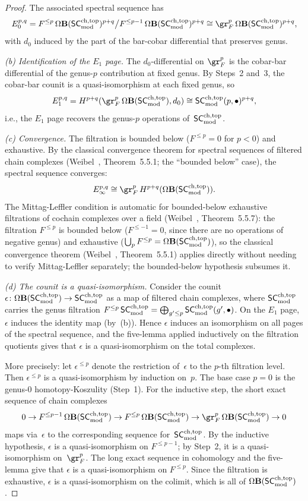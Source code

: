 \begin{proof}
The associated spectral sequence has
\[
 E_0^{p,q}
 = F^{\le p}\, \Omega\mathbf{B}(\SCmod)^{p+q} \big/
 F^{\le p-1}\, \Omega\mathbf{B}(\SCmod)^{p+q}
 \cong
 \gr_F^p\, \Omega\mathbf{B}(\SCmod)^{p+q},
\]
with $d_0$ induced by the part of the bar-cobar differential
that preserves genus.

\medskip
\emph{(b) Identification of the $E_1$ page.}
The $d_0$-differential on $\gr_F^p$ is the cobar-bar differential
of the genus-$p$ contribution at fixed genus. By Steps~2 and~3,
the cobar-bar counit is a quasi-isomorphism at each fixed genus,
so
\[
 E_1^{p,q}
 = H^{p+q}(\gr_F^p\, \Omega\mathbf{B}(\SCmod), d_0)
 \cong \SCmod(p, \bullet)^{p+q},
\]
i.e., the $E_1$ page recovers the genus-$p$ operations of~$\mathsf{SC}^{\mathrm{ch,top}}_{\mathrm{mod}}$.

\medskip
\emph{(c) Convergence.}
The filtration is bounded below ($F^{\le p} = 0$ for $p < 0$)
and exhaustive. By the classical convergence theorem for
spectral sequences of filtered chain complexes
(Weibel~\cite{Wei94}, Theorem~5.5.1; the ``bounded below''
case), the spectral sequence converges:
\[
 E_\infty^{p,q} \cong \gr_F^p\, H^{p+q}(\Omega\mathbf{B}(\SCmod)).
\]
The Mittag-Leffler condition is automatic for bounded-below
exhaustive filtrations of cochain complexes over a field
(Weibel~\cite{Wei94}, Theorem~5.5.7): the filtration
$F^{\le p}$ is bounded below ($F^{\le -1} = 0$, since there
are no operations of negative genus) and exhaustive
($\bigcup_p F^{\le p} = \Omega\mathbf{B}(\mathsf{SC}^{\mathrm{ch,top}}_{\mathrm{mod}})$), so the
classical convergence theorem (Weibel~\cite{Wei94},
Theorem~5.5.1) applies directly without needing to verify
Mittag-Leffler separately; the bounded-below hypothesis
subsumes it.

\medskip
\emph{(d) The counit is a quasi-isomorphism.}
Consider the counit $\epsilon \colon \Omega\mathbf{B}(\mathsf{SC}^{\mathrm{ch,top}}_{\mathrm{mod}})
\to \mathsf{SC}^{\mathrm{ch,top}}_{\mathrm{mod}}$ as a map of filtered chain complexes, where $\mathsf{SC}^{\mathrm{ch,top}}_{\mathrm{mod}}$
carries the genus filtration
$F^{\le p}\, \mathsf{SC}^{\mathrm{ch,top}}_{\mathrm{mod}} = \bigoplus_{g' \le p} \mathsf{SC}^{\mathrm{ch,top}}_{\mathrm{mod}}(g', \bullet)$.
On the $E_1$ page, $\epsilon$ induces the identity map (by~(b)).
Hence $\epsilon$ induces an isomorphism on all pages of the
spectral sequence, and the five-lemma applied inductively on
the filtration quotients gives that $\epsilon$ is a
quasi-isomorphism on the total complexes.

More precisely: let $\epsilon^{\le p}$ denote the restriction
of~$\epsilon$ to the $p$-th filtration level. Then
$\epsilon^{\le p}$ is a quasi-isomorphism by induction on~$p$.
The base case $p = 0$ is the genus-$0$ homotopy-Koszulity
(Step~1). For the inductive step, the short exact sequence of
chain complexes
\[
 0 \to F^{\le p-1}\, \Omega\mathbf{B}(\SCmod)
 \to F^{\le p}\, \Omega\mathbf{B}(\SCmod)
 \to \gr_F^p\, \Omega\mathbf{B}(\SCmod) \to 0
\]
maps via~$\epsilon$ to the corresponding sequence for~$\mathsf{SC}^{\mathrm{ch,top}}_{\mathrm{mod}}$.
By the inductive hypothesis, $\epsilon$ is a quasi-isomorphism on
$F^{\le p-1}$; by Step~2, it is a quasi-isomorphism on~$\gr_F^p$.
The long exact sequence in cohomology and the five-lemma give
that $\epsilon$ is a quasi-isomorphism on $F^{\le p}$.
Since the filtration is exhaustive, $\epsilon$ is a
quasi-isomorphism on the colimit, which is all of
$\Omega\mathbf{B}(\mathsf{SC}^{\mathrm{ch,top}}_{\mathrm{mod}})$.
\end{proof}


